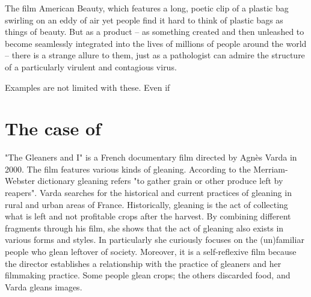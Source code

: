 

The film American Beauty, which features a long, poetic clip of a plastic bag swirling on an eddy of air yet people find it hard to think of plastic bags as things of beauty. But as a product -- as something created and then unleashed to become seamlessly integrated into the lives of millions of people around the world -- there is a strange allure to them, just as a pathologist can admire the structure of a particularly virulent and contagious virus.

Examples are not limited with these. Even if 





%
%
\section{The case of }
"The Gleaners and I" is a French documentary film directed by Agnès Varda in 2000. The film features various kinds of gleaning. According to the Merriam-Webster dictionary gleaning refers "to gather grain or other produce left by reapers". Varda searches for the historical and current practices of gleaning in rural and urban areas of France. Historically, gleaning is the act of collecting what is left and not profitable crops after the harvest. By combining different fragments through his film, she shows that the act of gleaning also exists in various forms and styles. In particularly she curiously focuses on the (un)familiar people who glean leftover of society. Moreover, it is a self-reflexive film because the director establishes a relationship with the practice of gleaners and her filmmaking practice. Some people glean crops; the others discarded food, and Varda gleans images.

